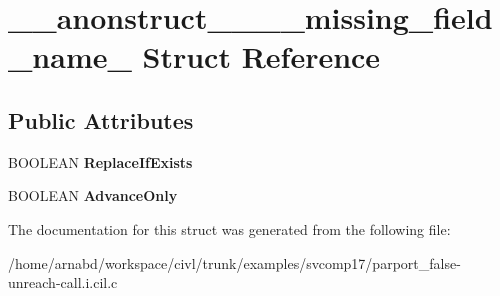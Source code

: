 \hypertarget{struct____anonstruct________missing__field__name__62}{}\section{\+\_\+\+\_\+anonstruct\+\_\+\+\_\+\+\_\+\+\_\+missing\+\_\+field\+\_\+name\+\_ Struct Reference}
\label{struct____anonstruct________missing__field__name__62}
\subsection*{Public Attributes}
\begin{DoxyCompactItemize}
\item 
\hypertarget{struct____anonstruct________missing__field__name__62_acecde6cd342952824d73d00d2f315392}{}B\+O\+O\+L\+E\+A\+N {\bfseries Replace\+If\+Exists}\label{struct____anonstruct________missing__field__name__62_acecde6cd342952824d73d00d2f315392}

\item 
\hypertarget{struct____anonstruct________missing__field__name__62_a2b341ac4e2ba91cde7e59d9f86633ddc}{}B\+O\+O\+L\+E\+A\+N {\bfseries Advance\+Only}\label{struct____anonstruct________missing__field__name__62_a2b341ac4e2ba91cde7e59d9f86633ddc}

\end{DoxyCompactItemize}


The documentation for this struct was generated from the following file\+:\begin{DoxyCompactItemize}
\item 
/home/arnabd/workspace/civl/trunk/examples/svcomp17/parport\+\_\+false-\/unreach-\/call.\+i.\+cil.\+c\end{DoxyCompactItemize}
